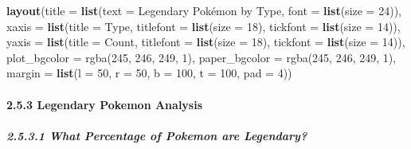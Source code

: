 \documentclass[
]{article}
\newenvironment{Shaded}{\begin{snugshade}}{\end{snugshade}}
\newcommand{\AttributeTok}[1]{\textcolor[rgb]{0.13,0.29,0.53}{#1}}
\newcommand{\DecValTok}[1]{\textcolor[rgb]{0.00,0.00,0.81}{#1}}
\newcommand{\FunctionTok}[1]{\textcolor[rgb]{0.13,0.29,0.53}{\textbf{#1}}}
\newcommand{\NormalTok}[1]{#1}
\newcommand{\StringTok}[1]{\textcolor[rgb]{0.31,0.60,0.02}{#1}}
\begin{document}
\begin{Shaded}
\begin{Highlighting}[]
\FunctionTok{layout}\NormalTok{(}\AttributeTok{title =} \FunctionTok{list}\NormalTok{(}\AttributeTok{text =} \StringTok{\textquotesingle{}Legendary Pokémon by Type\textquotesingle{}}\NormalTok{, }\AttributeTok{font =} \FunctionTok{list}\NormalTok{(}\AttributeTok{size =} \DecValTok{24}\NormalTok{)),}
       \AttributeTok{xaxis =} \FunctionTok{list}\NormalTok{(}\AttributeTok{title =} \StringTok{\textquotesingle{}Type\textquotesingle{}}\NormalTok{, }\AttributeTok{titlefont =} \FunctionTok{list}\NormalTok{(}\AttributeTok{size =} \DecValTok{18}\NormalTok{), }\AttributeTok{tickfont =} \FunctionTok{list}\NormalTok{(}\AttributeTok{size =} \DecValTok{14}\NormalTok{)),}
       \AttributeTok{yaxis =} \FunctionTok{list}\NormalTok{(}\AttributeTok{title =} \StringTok{\textquotesingle{}Count\textquotesingle{}}\NormalTok{, }\AttributeTok{titlefont =} \FunctionTok{list}\NormalTok{(}\AttributeTok{size =} \DecValTok{18}\NormalTok{), }\AttributeTok{tickfont =} \FunctionTok{list}\NormalTok{(}\AttributeTok{size =} \DecValTok{14}\NormalTok{)),}
       \AttributeTok{plot\_bgcolor =} \StringTok{\textquotesingle{}rgba(245, 246, 249, 1)\textquotesingle{}}\NormalTok{,}
       \AttributeTok{paper\_bgcolor =} \StringTok{\textquotesingle{}rgba(245, 246, 249, 1)\textquotesingle{}}\NormalTok{,}
       \AttributeTok{margin =} \FunctionTok{list}\NormalTok{(}\AttributeTok{l =} \DecValTok{50}\NormalTok{, }\AttributeTok{r =} \DecValTok{50}\NormalTok{, }\AttributeTok{b =} \DecValTok{100}\NormalTok{, }\AttributeTok{t =} \DecValTok{100}\NormalTok{, }\AttributeTok{pad =} \DecValTok{4}\NormalTok{))}
\end{Highlighting}
\end{Shaded}

\paragraph{2.5.3 Legendary Pokemon
Analysis}\label{legendary-pokemon-analysis}

\subparagraph{2.5.3.1 What Percentage of Pokemon are
Legendary?}\label{what-percentage-of-pokemon-are-legendary}
\end{document}
